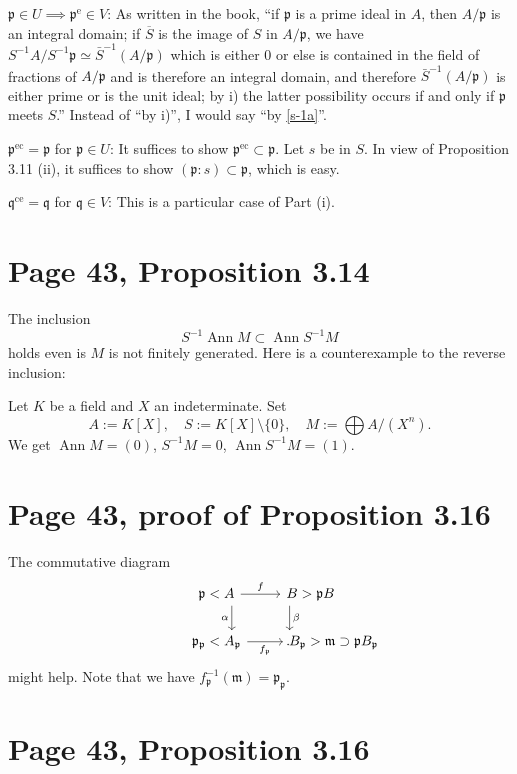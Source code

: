 \documentclass[parskip=half]{scrartcl}%
\newcommand{\oo}{\operatorname}
\newcommand{\mf}{\mathfrak}
\newcommand{\ppp}{\mf p}
\begin{document}
$\mf p\in U\implies\mf p^{\oo e}\in V$: As written in the book, ``if $\mf p$ is a prime ideal in $A$, then $A/\mf p$ is an integral domain; if $\overline S$ is the image of $S$ in $A/\mf p$, we have $S^{-1}A/S^{-1}\mf p\simeq\bar S^{-1}(A/\mf p)$ which is either $0$ or else is contained in the field of fractions of $A/\mf p$ and is therefore an integral domain, and therefore $\bar S^{-1}(A/\mf p)$ is either prime or is the unit ideal; by i) the latter possibility occurs if and only if $\mf p$ meets $S$.'' Instead of ``by i)'', I would say ``by \eqref{s-1a}''.

$\mf p^{\oo{ec}}=\mf p$ for $\mf p\in U$: It suffices to show $\mf p^{\oo{ec}}\subset\mf p$. Let $s$ be in $S$. In view of Proposition 3.11 (ii), it suffices to show $(\mf p:s)\subset\mf p$, which is easy.

$\mf q^{\oo{ce}}=\mf q$ for $\mf q\in V$: This is a particular case of Part (i).

\section{Page 43, Proposition 3.14}%

The inclusion 
$$
S^{-1}\oo{Ann}M\subset\oo{Ann}S^{-1}M
$$ 
holds even is $M$ is not finitely generated. Here is a counterexample to the reverse inclusion:

Let $K$ be a field and $X$ an indeterminate. Set 
$$
A:=K[X],\quad S:=K[X]\setminus\{0\},\quad M:=\bigoplus A/(X^n).
$$ 
We get $\oo{Ann}M=(0)$, $S^{-1}M=0$, $\oo{Ann}S^{-1}M=(1)$. 

\section{Page 43, proof of Proposition 3.16}%

The commutative diagram
$$
\begin{tikzcd}
\kern-22pt\ppp<A\ar[d,"\alpha"']\ar[r,"f"]&B>\ppp B\ar[d,"\beta"]\kern-30pt\\ 
\kern-22pt\ppp_\ppp<A_\ppp\ar[r,"f_\ppp"']&B_\ppp>\mf m\supset\ppp B_\ppp\kern-66pt.
\end{tikzcd}
$$ 
might help. Note that we have $f_\ppp^{-1}(\mf m)=\ppp_\ppp$.


\section{Page 43, Proposition 3.16}\label{43}%
\end{document}
